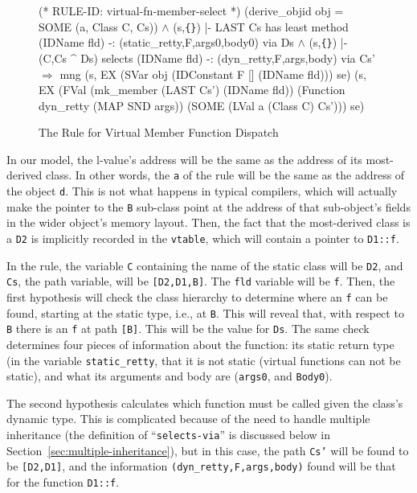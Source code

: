 \documentclass[11pt]{article}
\newcommand{\lbr}{\texttt{\{}}
\newcommand{\rbr}{\texttt{\}}}
\begin{document}
\begin{figure}[hbtp]
%
\begin{stdrule}
(* RULE-ID: virtual-fn-member-select *)
     (derive_objid obj = SOME (a, Class C, Cs)) \(\land\)
     (s,\lbr\rbr) |- LAST Cs has least method
                 (IDName fld) -:
                 (static_retty,F,args0,body0) via
                 Ds \(\land\)
     (s,\lbr\rbr) |- (C,Cs ^ Ds) selects
                 (IDName fld) -:
                 (dyn_retty,F,args,body) via
                 Cs'
   \(\Rightarrow\)
     mng (s, EX (SVar obj (IDConstant F [] (IDName fld))) se)
         (s, EX (FVal (mk_member (LAST Cs') (IDName fld))
                      (Function dyn_retty (MAP SND args))
                      (SOME (LVal a (Class C) Cs'))) se)

\end{stdrule}
\caption{The Rule for Virtual Member Function Dispatch}
\label{fig:virtual-fn-member-select}
\end{figure}

In our model, the l-value's address will be the same as the address of
its most-derived class.  In other words, the \texttt{a} of the rule
will be the same as the address of the object \texttt{d}.  This is not
what happens in typical compilers, which will actually make the
pointer to the \texttt{B} sub-class point at the address of that
sub-object's fields in the wider object's memory layout.  Then, the
fact that the most-derived class is a \texttt{D2} is implicitly
recorded in the \texttt{vtable}, which will contain a pointer to
\texttt{D1::f}.

In the rule, the variable \texttt{C} containing the name of the static
class will be \texttt{D2}, and \texttt{Cs}, the path variable, will be
\texttt{[D2,D1,B]}.  The \texttt{fld} variable will be \texttt{f}.
Then, the first hypothesis will check the class hierarchy to determine
where an \texttt{f} can be found, starting at the static type, i.e.,
at \texttt{B}.  This will reveal that, with respect to \texttt{B}
there is an \texttt{f} at path \texttt{[B]}.  This will be the value
for \texttt{Ds}.  The same check determines four pieces of information
about the function: its static return type (in the variable
\texttt{static_retty}, that it is not static (virtual functions can
not be static), and what its arguments and body are (\texttt{args0},
and \texttt{Body0}).

The second hypothesis calculates which function must be called given
the class's dynamic type.  This is complicated because of the need to
handle multiple inheritance (the definition of
``\texttt{selects-via}'' is discussed below in
Section~\ref{sec:multiple-inheritance}), but in this case, the path
\texttt{Cs'} will be found to be \texttt{[D2,D1]}, and the information
\texttt{(dyn_retty,F,args,body)} found will be that for the function
\texttt{D1::f}.
\end{document}
